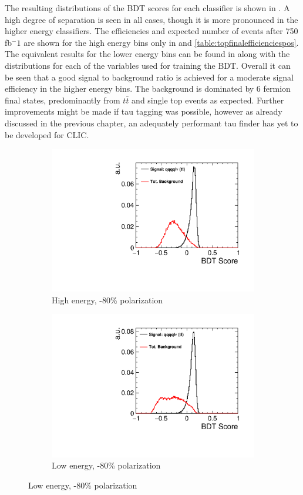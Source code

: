 The resulting distributions of the \ac{BDT} scores for each classifier is shown in . A high degree of separation is seen in all cases, though it is more pronounced in the higher energy classifiers. The efficiencies and expected number of events after 750 fb$^-1$ are shown for the high energy bins only in  and \ref{table:topfinalefficienciespos}. The equivalent results for the lower energy bins can be found in  along with the distributions for each of the variables used for training the \ac{BDT}. Overall it can be seen that a good signal to background ratio is achieved for a moderate signal efficiency in the higher energy bins. The background is dominated by 6 fermion final states, predominantly from $t\bar{t}$ and single top events as expected. Further improvements might be made if tau tagging was possible, however as already discussed in the previous chapter, an adequately performant tau finder has yet to be developed for \ac{CLIC}. 

\begin{figure}[ht] 
  \begin{subfigure}[b]{0.5\linewidth}
    \centering
    \includegraphics[width=0.75\linewidth]{TopAnalysis/figures/BDTScoreHighENeg.pdf} 
    \caption{High energy, -80\% polarization} 
    \vspace{4ex}
  \end{subfigure}%
  \begin{subfigure}[b]{0.5\linewidth}
    \centering
    \includegraphics[width=0.75\linewidth]{TopAnalysis/figures/BDTScoreLowENeg.pdf} 
    \caption{Low energy, -80\% polarization} 
    \vspace{4ex}
  \end{subfigure} 
\end{figure}

